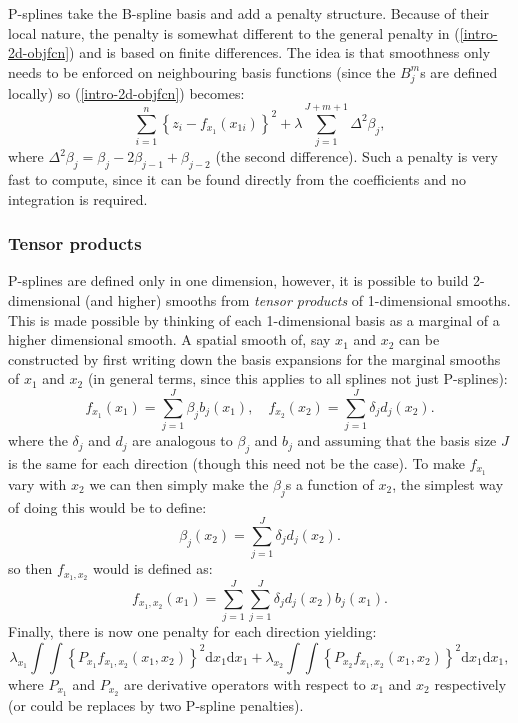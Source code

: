 P-splines take the B-spline basis and add a penalty structure. Because of their local nature, the penalty is somewhat different to the general penalty in (\ref{intro-2d-objfcn}) and is based on finite differences. The idea is that smoothness only needs to be enforced on neighbouring basis functions (since the $B^m_j$s are defined locally) so (\ref{intro-2d-objfcn}) becomes:
\begin{equation*}
\sum_{i=1}^n \left \{ z_i - f_{x_1}(x_{1i}) \right \}^2 +  \lambda \sum_{j=1}^{J+m+1} \Delta^2 \beta_j,
\end{equation*}
where $\Delta^2 \beta_j = \beta_j -2\beta_{j-1} + \beta_{j-2}$ (the second difference). Such a penalty is very fast to compute, since it can be found directly from the coefficients and no integration is required.

\subsubsection{Tensor products}
\label{GAMtensor}

P-splines are defined only in one dimension, however, it is possible to build 2-dimensional (and higher) smooths from \textit{tensor products} of 1-dimensional smooths. This is made possible by thinking of each 1-dimensional basis as a marginal of a higher dimensional smooth. A spatial smooth of, say $x_1$ and $x_2$ can be constructed by first writing down the basis expansions for the marginal smooths of $x_1$ and $x_2$ (in general terms, since this applies to all splines not just P-splines):
\begin{equation*}
f_{x_1}(x_1) = \sum_{j=1}^J \beta_j b_j(x_{1}), \quad  f_{x_2}(x_2) = \sum_{j=1}^J \delta_j d_j(x_{2}).
\end{equation*}
where the $\delta_j$ and $d_j$ are analogous to $\beta_j$ and $b_j$ and assuming that the basis size $J$ is the same for each direction (though this need not be the case). To make $f_{x_1}$ vary with $x_2$ we can then simply make the $\beta_j$s a function of $x_2$, the simplest way of doing this would be to define:
\begin{equation*}
\beta_j(x_2) = \sum_{j=1}^J \delta_j d_j(x_{2}).
\end{equation*}
so then $f_{x_1,x_2}$ would is defined as:
\begin{equation*}
f_{x_1, x_2}(x_1) = \sum_{j=1}^J \sum_{j=1}^J \delta_j d_j(x_{2}) b_j(x_{1}).
\end{equation*}
Finally, there is now one penalty for each direction yielding:
\begin{equation*}
\lambda_{x_1} \int\int \left \{P_{x_1} f_{x_1, x_2}(x_1,x_2)\right \}^2 \text{d}x_1\text{d}x_1 + \lambda_{x_2} \int\int \left \{P_{x_2} f_{x_1, x_2}(x_1,x_2)\right \}^2 \text{d}x_1\text{d}x_1,
\end{equation*}
where $P_{x_1}$ and $P_{x_2}$ are derivative operators with respect to $x_1$ and $x_2$ respectively (or could be replaces by two P-spline penalties). 

